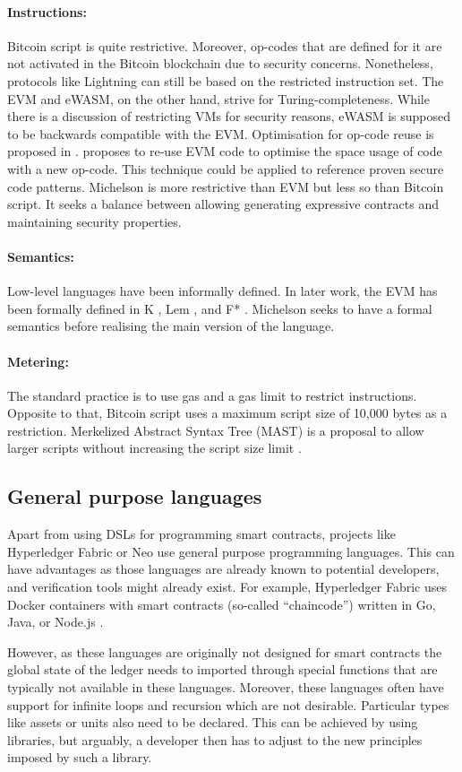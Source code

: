 \paragraph{Instructions:} Bitcoin script is quite restrictive. Moreover, op-codes that are defined for it are not activated in the Bitcoin blockchain due to security concerns. Nonetheless, protocols like Lightning \cite{Poon2016} can still be based on the restricted instruction set.
The EVM and eWASM, on the other hand, strive for Turing-completeness. While there is a discussion of restricting VMs for security reasons, eWASM is supposed to be backwards compatible with the EVM.
Optimisation for op-code reuse is proposed in \cite{Pontiveros2018}.
\citeauthor{Pontiveros2018} proposes to re-use EVM code to optimise the space usage of code with a new op-code. This technique could be applied to reference proven secure code patterns.
Michelson is more restrictive than EVM but less so than Bitcoin script. It seeks a balance between allowing generating expressive contracts and maintaining security properties.

\paragraph{Semantics:} Low-level languages have been informally defined. In later work, the EVM has been formally defined in K \cite{Hildenbrandt2017}, Lem \cite{Hirai2017}, and F* \cite{Grishchenko2018}. Michelson seeks to have a formal semantics before realising the main version of the language.

\paragraph{Metering:} The standard practice is to use gas and a gas limit to restrict instructions. Opposite to that, Bitcoin script uses a maximum script size of 10,000 bytes as a restriction. Merkelized Abstract Syntax Tree (MAST) is a proposal to allow larger scripts without increasing the script size limit \cite{Harding2017}.


\subsection{General purpose languages}
Apart from using DSLs for programming smart contracts, projects like Hyperledger Fabric or Neo use general purpose programming languages.
This can have advantages as those languages are already known to potential developers, and verification tools might already exist.
For example, Hyperledger Fabric uses Docker containers with smart contracts (so-called ``chaincode'') written in Go, Java, or Node.js \cite{Cachin2016}. 

However, as these languages are originally not designed for smart contracts the global state of the ledger needs to imported through special functions that are typically not available in these languages.
Moreover, these languages often have support for infinite loops and recursion which are not desirable.
Particular types like assets or units also need to be declared. 
This can be achieved by using libraries, but arguably, a developer then has to adjust to the new principles imposed by such a library.